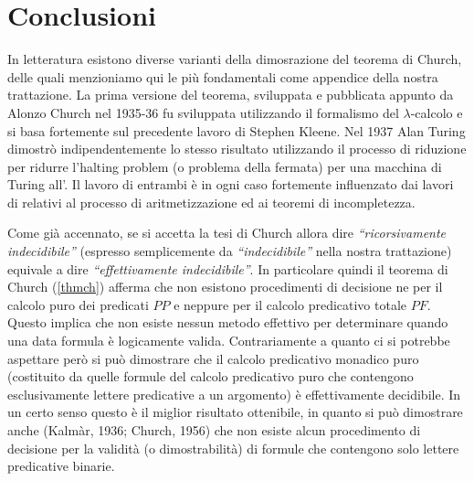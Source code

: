 \section{Conclusioni}
\label{chrcon}

In letteratura esistono diverse varianti della dimosrazione del teorema di Church, delle quali
menzioniamo qui le più fondamentali come appendice della nostra trattazione. La prima versione
del teorema,
sviluppata e pubblicata appunto da Alonzo Church nel 1935-36 fu sviluppata utilizzando il formalismo del 
$\lambda$-calcolo e si basa fortemente sul precedente lavoro di Stephen Kleene. 
Nel 1937 Alan Turing dimostrò
indipendentemente lo stesso risultato utilizzando il processo di riduzione per ridurre l'halting
problem (o problema della fermata) per una macchina di Turing all'\ents. Il lavoro di entrambi è
in ogni caso fortemente influenzato dai lavori di \godel relativi al processo di aritmetizzazione
ed ai teoremi di incompletezza.
$$$$

Come già accennato, se si accetta la tesi di Church allora dire \textit{``ricorsivamente indecidibile''} 
(espresso semplicemente da \textit{``indecidibile''} nella nostra trattazione) equivale a dire \textit{``effettivamente indecidibile''}.
In particolare quindi il teorema di Church (\ref{thmch}) afferma che non esistono procedimenti di
decisione ne per il calcolo puro dei predicati $PP$ e neppure per il calcolo predicativo totale $PF$.
Questo implica che non esiste nessun metodo effettivo per determinare quando una data formula
è logicamente valida. \newline
Contrariamente a quanto ci si potrebbe aspettare però si può dimostrare che il calcolo predicativo
monadico puro (costituito da quelle formule del calcolo predicativo puro che contengono esclusivamente
lettere predicative a un argomento) è effettivamente decidibile. In un certo senso questo è il
miglior risultato ottenibile, in quanto si può dimostrare anche (Kalmàr, 1936; Church, 1956) che non esiste
alcun procedimento di decisione per la validità (o dimostrabilità) di formule che contengono solo lettere predicative binarie.




